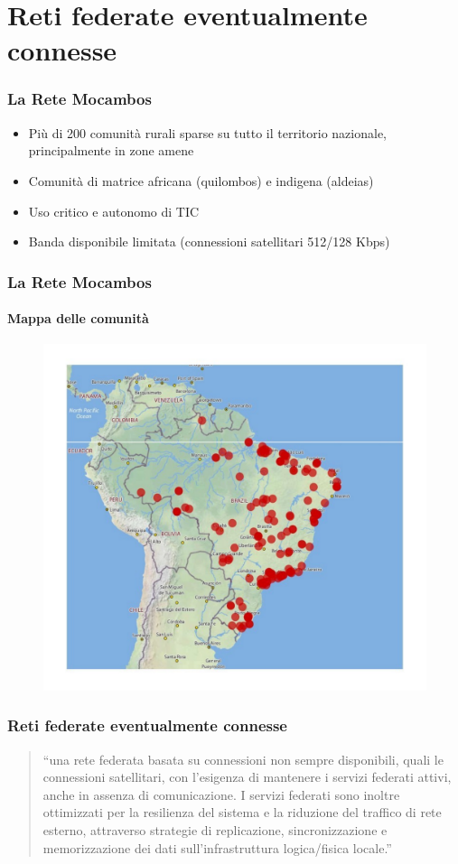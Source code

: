 \documentclass{beamer}
\begin{document}
\section{Reti federate eventualmente connesse}

\begin{frame}
  \frametitle{La Rete Mocambos}
  \begin{itemize}
    \item Più di 200 comunità rurali sparse su tutto il territorio
      nazionale, principalmente in zone amene
    \item Comunità di matrice africana (quilombos) e indigena (aldeias)
    \item Uso critico e autonomo di TIC
    \item Banda disponibile limitata (connessioni satellitari 512/128 Kbps)
    \end{itemize}
\end{frame}

\begin{frame}
  \frametitle{La Rete Mocambos}
  \framesubtitle{Mappa delle comunità}
	\begin{figure}
		\includegraphics[height=0.7\textheight]{./Figure/MappaRedeMocambos.pdf}
	\end{figure}
\end{frame}




\begin{frame}
  \frametitle{Reti federate eventualmente connesse}
  \begin{quotation}
    ``una rete federata basata su connessioni non sempre disponibili,
    quali le connessioni satellitari, con l'esigenza di mantenere i
    servizi federati attivi, anche in assenza di comunicazione. I
    servizi federati sono inoltre ottimizzati per la resilienza del
    sistema e la riduzione del traffico di rete esterno, attraverso
    strategie di replicazione, sincronizzazione e memorizzazione dei
    dati sull'infrastruttura logica/fisica locale.''
    \end{quotation}
\end{frame}
\end{document}
